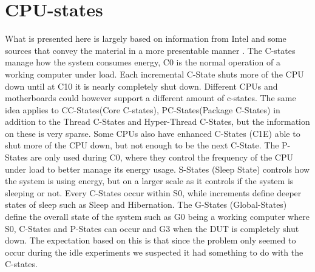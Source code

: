 \section{CPU-states}\label{app:CPU_states}
 What is presented here is largely based on information from Intel\cite{CIntel} and some sources that convey the material in a more presentable manner \cite{CMete,CLinux}. The C-states manage how the system consumes energy, C0 is the normal operation of a working computer under load. Each incremental C-State shuts more of the CPU down until at C10 it is nearly completely shut down. Different CPUs and motherboards could however support a different amount of c-states. The same idea applies to CC-States(Core C-states), PC-States(Package C-States) in addition to the Thread C-States and Hyper-Thread C-States, but the information on these is very sparse. Some CPUs also have enhanced C-States (C1E) able to shut more of the CPU down, but not enough to be the next C-State. The P-States are only used during C0, where they control the frequency of the CPU under load to better manage its energy usage. S-States (Sleep State) controls how the system is using energy, but on a larger scale as it controls if the system is sleeping or not. Every C-States occur within S0, while increments define deeper states of sleep such as Sleep and Hibernation. The G-States (Global-States) define the overall state of the system such as G0 being a working computer where S0, C-States and P-States can occur and G3 when the DUT is completely shut down. The expectation based on this is that since the problem only seemed to occur during the idle experiments we suspected it had something to do with the C-states.
